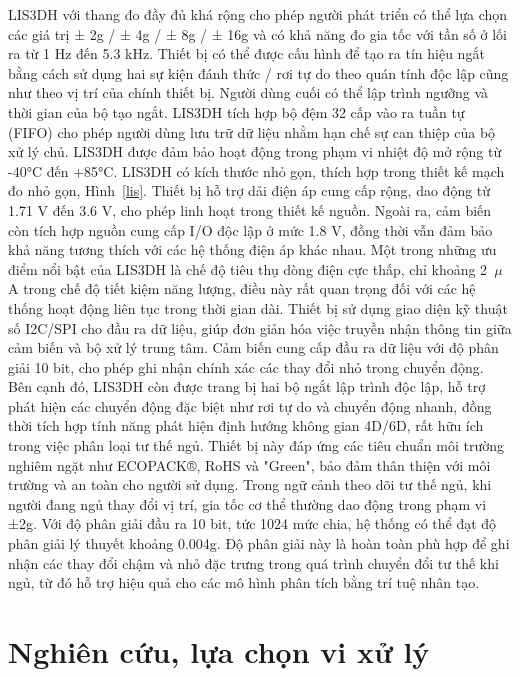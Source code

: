 LIS3DH với thang đo đầy đủ khá rộng cho phép người phát triển có thể lựa chọn các giá trị ± 2g / ± 4g / ± 8g / ± 16g và có khả năng đo gia tốc với tần số ở lối ra từ 1 Hz đến 5.3 kHz. Thiết bị có thể được cấu hình để tạo ra tín hiệu ngắt bằng cách sử dụng hai sự kiện đánh thức / rơi tự do theo quán tính độc lập cũng như theo vị trí của chính thiết bị. Người dùng cuối có thể lập trình ngưỡng và thời gian của bộ tạo ngắt. LIS3DH tích hợp bộ đệm 32 cấp vào ra tuần tự (FIFO) cho phép người dùng lưu trữ dữ liệu nhằm hạn chế sự can thiệp của bộ xử lý chủ. LIS3DH được đảm bảo hoạt động trong phạm vi nhiệt độ mở rộng từ -40°C đến +85°C. LIS3DH có kích thước nhỏ gọn, thích hợp trong thiết kế mạch đo nhỏ gọn, Hình~\ref{lis}. Thiết bị hỗ trợ dải điện áp cung cấp rộng, dao động từ 1.71 V đến 3.6 V, cho phép linh hoạt trong thiết kế nguồn. Ngoài ra, cảm biến còn tích hợp nguồn cung cấp I/O độc lập ở mức 1.8 V, đồng thời vẫn đảm bảo khả năng tương thích với các hệ thống điện áp khác nhau. Một trong những ưu điểm nổi bật của LIS3DH là chế độ tiêu thụ dòng điện cực thấp, chỉ khoảng 2~$\mu$A trong chế độ tiết kiệm năng lượng, điều này rất quan trọng đối với các hệ thống hoạt động liên tục trong thời gian dài. Thiết bị sử dụng giao diện kỹ thuật số I2C/SPI cho đầu ra dữ liệu, giúp đơn giản hóa việc truyền nhận thông tin giữa cảm biến và bộ xử lý trung tâm. Cảm biến cung cấp đầu ra dữ liệu với độ phân giải 10 bit, cho phép ghi nhận chính xác các thay đổi nhỏ trong chuyển động. Bên cạnh đó, LIS3DH còn được trang bị hai bộ ngắt lập trình độc lập, hỗ trợ phát hiện các chuyển động đặc biệt như rơi tự do và chuyển động nhanh, đồng thời tích hợp tính năng phát hiện định hướng không gian 4D/6D, rất hữu ích trong việc phân loại tư thế ngủ. Thiết bị này đáp ứng các tiêu chuẩn môi trường nghiêm ngặt như ECOPACK®, RoHS và "Green", bảo đảm thân thiện với môi trường và an toàn cho người sử dụng. Trong ngữ cảnh theo dõi tư thế ngủ, khi người đang ngủ thay đổi vị trí, gia tốc cơ thể thường dao động trong phạm vi ±2g. Với độ phân giải đầu ra 10 bit, tức 1024 mức chia, hệ thống có thể đạt độ phân giải lý thuyết khoảng 0.004g. Độ phân giải này là hoàn toàn phù hợp để ghi nhận các thay đổi chậm và nhỏ đặc trưng trong quá trình chuyển đổi tư thế khi ngủ, từ đó hỗ trợ hiệu quả cho các mô hình phân tích bằng trí tuệ nhân tạo.


\section{Nghiên cứu, lựa chọn vi xử lý}

